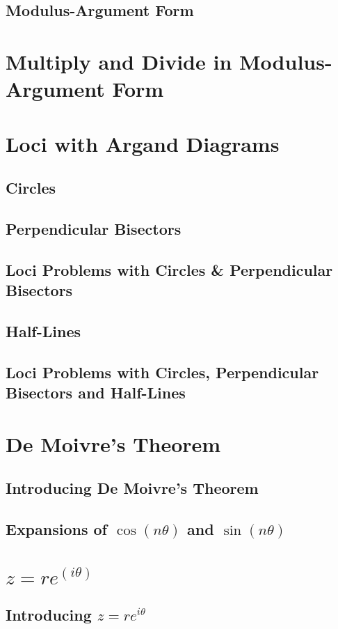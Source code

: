 \documentclass[../maths.tex]{subfiles}
\begin{document}
\subsection*{Modulus-Argument Form}
\section{Multiply and Divide in Modulus-Argument Form}
\section{Loci with Argand Diagrams}
\subsection*{Circles}
\subsection*{Perpendicular Bisectors}
\subsection*{Loci Problems with Circles \& Perpendicular Bisectors}
\subsection*{Half-Lines}
\subsection*{Loci Problems with Circles, Perpendicular Bisectors and Half-Lines}
\section{De Moivre's Theorem}
\subsection*{Introducing De Moivre's Theorem}
\subsection*{Expansions of \texorpdfstring{$\cos(n\theta)$}{cos(n*theta)} and \texorpdfstring{$\sin(n\theta)$}{sin(n*theta)}}
\section{\texorpdfstring{$z=re^{(i\theta)}$}{z=re to the power of i*theta}}
\subsection*{Introducing \texorpdfstring{$z=re^{i\theta}$}{z=re to the power of i*theta}}
\end{document}
